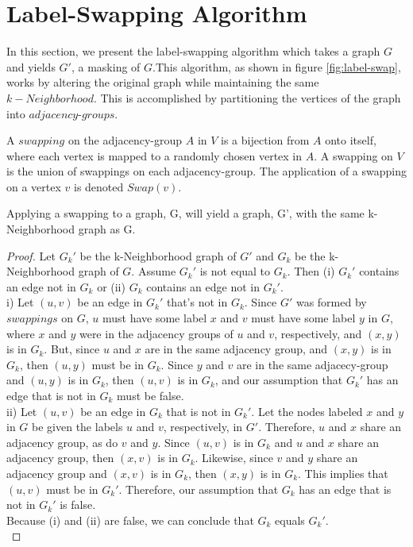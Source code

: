 \section{Label-Swapping Algorithm}
\indent In this section, we present the label-swapping algorithm which takes a graph $G$ and yields $G'$, a masking of $G$.This algorithm, as shown in figure \ref{fig:label-swap}, works by altering the original graph while maintaining the same $k-Neighborhood$. This is accomplished by partitioning the vertices of the graph into $adjacency$-$groups$.

\begin{dfn}
	A $swapping$ on the adjacency-group $A$ in $V$ is a bijection from $A$ onto itself, where each vertex is mapped to a randomly chosen vertex in $A$. A swapping on $V$ is the union of swappings on each adjacency-group. The application of a swapping on a vertex $v$ is denoted $Swap(v)$.
\end{dfn}

\begin{thm}  
	Applying a swapping to a graph, G, will yield a graph, G', with the same k-Neighborhood graph as G.
\end{thm}

\begin{proof}
\noindent Let $G_k'$ be the k-Neighborhood graph of $G'$ and $G_k$ be the k-Neighborhood graph of $G$. Assume $G_k'$ is not equal to $G_k$. Then (i) $G_k'$ contains an edge not in $G_k$ or (ii) $G_k$ contains an edge not in $G_k'$.  \\
\indent i) Let $(u,v)$ be an edge in $G_k'$ that's not in $G_k$. Since $G'$ was formed by $swappings$ on $G$, $u$ must have some label $x$ and $v$ must have some label $y$ in $G$, where $x$ and $y$ were in the adjacency groups of $u$ and $v$, respectively, and $(x,y)$ is in $G_k$. But, since $u$ and $x$ are in the same adjacency group, and $(x,y)$ is in $G_k$, then $(u,y)$ must be in $G_k$. Since $y$ and $v$ are in the same adjacecy-group and $(u,y)$ is in $G_k$, then $(u,v)$ is in $G_k$, and our assumption that $G_k'$ has an edge that is not in $G_k$ must be false.\\
\indent 			ii) Let $(u,v)$ be an edge in $G_k$ that is not in $G_k'.$ Let the nodes labeled $x$ and $y$ in $G$ be given the labels $u$ and $v$, respectively, in $G'$. Therefore, $u$ and $x$ share an adjacency group, as do $v$ and $y$.  Since $(u,v)$ is in $G_k$ and $u$ and $x$ share an adjacency group, then $(x,v)$ is in $G_k$. Likewise, since $v$ and $y$ share an adjacency group and $(x,v)$ is in $G_k$, then $(x,y)$ is in $G_k$. This implies that $(u,v)$ must be in $G_k'$. Therefore, our assumption that $G_k$ has an edge that is not in $G_k'$ is false. \\
\indent Because (i) and (ii) are false, we can conclude that $G_k$ equals $G_k'$.\\
\end{proof}

